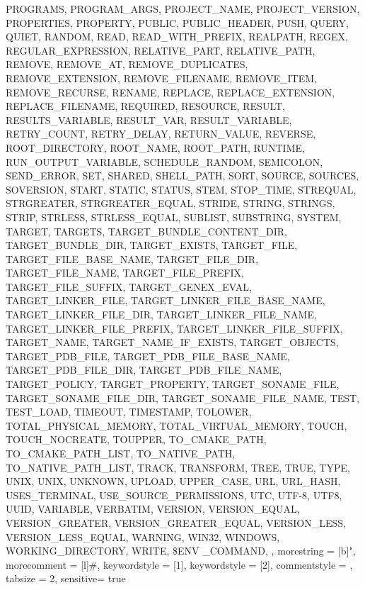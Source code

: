 {{    PROGRAMS,
    PROGRAM_ARGS,
    PROJECT_NAME,
    PROJECT_VERSION,
    PROPERTIES,
    PROPERTY,
    PUBLIC,
    PUBLIC_HEADER,
    PUSH,
    QUERY,
    QUIET,
    RANDOM,
    READ,
    READ_WITH_PREFIX,
    REALPATH,
    REGEX,
    REGULAR_EXPRESSION,
    RELATIVE_PART,
    RELATIVE_PATH,
    REMOVE,
    REMOVE_AT,
    REMOVE_DUPLICATES,
    REMOVE_EXTENSION,
    REMOVE_FILENAME,
    REMOVE_ITEM,
    REMOVE_RECURSE,
    RENAME,
    REPLACE,
    REPLACE_EXTENSION,
    REPLACE_FILENAME,
    REQUIRED,
    RESOURCE,
    RESULT,
    RESULTS_VARIABLE,
    RESULT_VAR,
    RESULT_VARIABLE,
    RETRY_COUNT,
    RETRY_DELAY,
    RETURN_VALUE,
    REVERSE,
    ROOT_DIRECTORY,
    ROOT_NAME,
    ROOT_PATH,
    RUNTIME,
    RUN_OUTPUT_VARIABLE,
    SCHEDULE_RANDOM,
    SEMICOLON,
    SEND_ERROR,
    SET,
    SHARED,
    SHELL_PATH,
    SORT,
    SOURCE,
    SOURCES,
    SOVERSION,
    START,
    STATIC,
    STATUS,
    STEM,
    STOP_TIME,
    STREQUAL,
    STRGREATER,
    STRGREATER_EQUAL,
    STRIDE,
    STRING,
    STRINGS,
    STRIP,
    STRLESS,
    STRLESS_EQUAL,
    SUBLIST,
    SUBSTRING,
    SYSTEM,
    TARGET,
    TARGETS,
    TARGET_BUNDLE_CONTENT_DIR,
    TARGET_BUNDLE_DIR,
    TARGET_EXISTS,
    TARGET_FILE,
    TARGET_FILE_BASE_NAME,
    TARGET_FILE_DIR,
    TARGET_FILE_NAME,
    TARGET_FILE_PREFIX,
    TARGET_FILE_SUFFIX,
    TARGET_GENEX_EVAL,
    TARGET_LINKER_FILE,
    TARGET_LINKER_FILE_BASE_NAME,
    TARGET_LINKER_FILE_DIR,
    TARGET_LINKER_FILE_NAME,
    TARGET_LINKER_FILE_PREFIX,
    TARGET_LINKER_FILE_SUFFIX,
    TARGET_NAME,
    TARGET_NAME_IF_EXISTS,
    TARGET_OBJECTS,
    TARGET_PDB_FILE,
    TARGET_PDB_FILE_BASE_NAME,
    TARGET_PDB_FILE_DIR,
    TARGET_PDB_FILE_NAME,
    TARGET_POLICY,
    TARGET_PROPERTY,
    TARGET_SONAME_FILE,
    TARGET_SONAME_FILE_DIR,
    TARGET_SONAME_FILE_NAME,
    TEST,
    TEST_LOAD,
    TIMEOUT,
    TIMESTAMP,
    TOLOWER,
    TOTAL_PHYSICAL_MEMORY,
    TOTAL_VIRTUAL_MEMORY,
    TOUCH,
    TOUCH_NOCREATE,
    TOUPPER,
    TO_CMAKE_PATH,
    TO_CMAKE_PATH_LIST,
    TO_NATIVE_PATH,
    TO_NATIVE_PATH_LIST,
    TRACK,
    TRANSFORM,
    TREE,
    TRUE,
    TYPE,
    UNIX,
    UNIX,
    UNKNOWN,
    UPLOAD,
    UPPER_CASE,
    URL,
    URL_HASH,
    USES_TERMINAL,
    USE_SOURCE_PERMISSIONS,
    UTC,
    UTF-8,
    UTF8,
    UUID,
    VARIABLE,
    VERBATIM,
    VERSION,
    VERSION_EQUAL,
    VERSION_GREATER,
    VERSION_GREATER_EQUAL,
    VERSION_LESS,
    VERSION_LESS_EQUAL,
    WARNING,
    WIN32,
    WINDOWS,
    WORKING_DIRECTORY,
    WRITE,
    \$ENV
    _COMMAND,
    },
  morestring = [b]",
  morecomment = [l]\#,
  keywordstyle = [1]\color{blue},
  keywordstyle = [2]\color{RedViolet},
  commentstyle = \color{comment-green},
  tabsize = 2,
  sensitive= true
}

